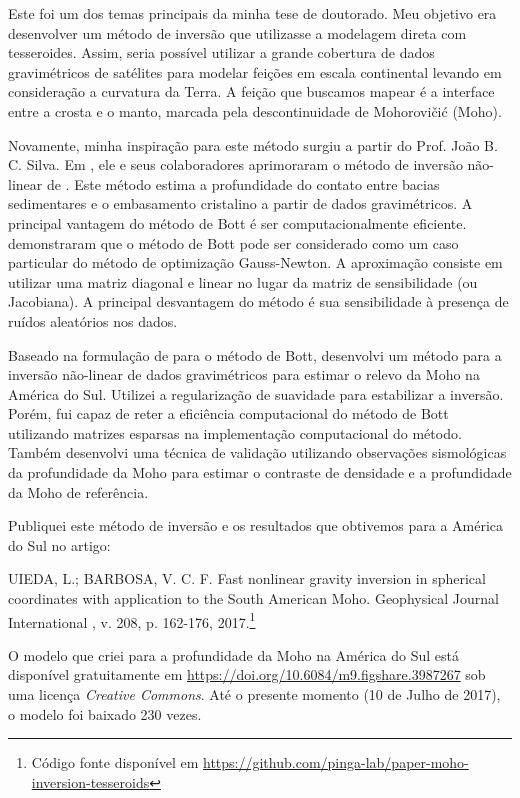 Este foi um dos temas principais da minha tese de doutorado.
Meu objetivo era desenvolver um método de inversão que utilizasse a modelagem
direta com tesseroides.
Assim, seria possível utilizar a grande cobertura de dados gravimétricos de
satélites para modelar feições em escala continental levando em
consideração a curvatura da Terra.
A feição que buscamos mapear é a interface entre a crosta e o manto, marcada
pela descontinuidade de Mohorovičić (Moho).

Novamente, minha inspiração para este método surgiu a partir do Prof. João B.
C. Silva.
Em \citet{silva2014}, ele e seus colaboradores aprimoraram o método de
inversão não-linear de \citet{bott}.
Este método estima a profundidade do contato entre bacias sedimentares e o
embasamento cristalino a partir de dados gravimétricos.
A principal vantagem do método de Bott é ser computacionalmente eficiente.
\citet{silva2014} demonstraram que o método de Bott pode ser considerado como
um caso particular do método de optimização Gauss-Newton.
A aproximação consiste em utilizar uma matriz diagonal e linear no lugar da
matriz de sensibilidade (ou Jacobiana).
A principal desvantagem do método é sua sensibilidade à presença de ruídos
aleatórios nos dados.

Baseado na formulação de \citet{silva2014} para o método de Bott, desenvolvi um
método para a inversão não-linear de dados gravimétricos para estimar o relevo
da Moho na América do Sul.
Utilizei a regularização de suavidade para estabilizar a inversão.
Porém, fui capaz de reter a eficiência computacional do método de Bott
utilizando matrizes esparsas na implementação computacional do método.
Também desenvolvi uma técnica de validação utilizando observações sismológicas
da profundidade da Moho para estimar o contraste de densidade e a profundidade
da Moho de referência.

Publiquei este método de inversão e os resultados que obtivemos para a América
do Sul no artigo:

\begin{displayquote}
    UIEDA, L.; BARBOSA, V. C. F. Fast nonlinear gravity inversion in spherical
    coordinates with application to the South American Moho. Geophysical
    Journal International , v. 208, p. 162-176, 2017.\footnote{Código fonte
    disponível em
    \url{https://github.com/pinga-lab/paper-moho-inversion-tesseroids}}
\end{displayquote}

O modelo que criei para a profundidade da Moho na América do Sul está
disponível gratuitamente em \url{https://doi.org/10.6084/m9.figshare.3987267}
sob uma licença \textit{Creative Commons}.
Até o presente momento (10 de Julho de 2017), o modelo foi
baixado 230 vezes.


